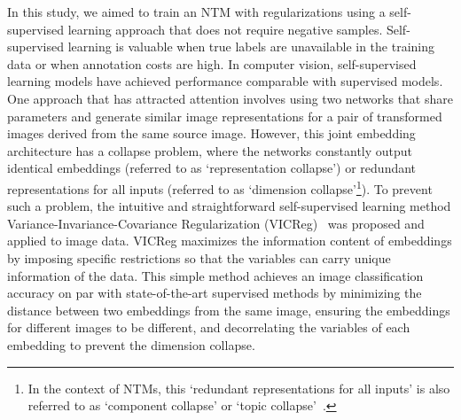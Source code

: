 \documentclass{article}
\begin{document}
In this study, we aimed to train an NTM with regularizations using a self-supervised learning approach that does not require negative samples. 
Self-supervised learning is valuable when true labels are unavailable in the training data or when annotation costs are high. 
In computer vision, self-supervised learning models have achieved performance comparable with supervised models. 
One approach that has attracted attention involves using two networks that share parameters and generate similar image representations for a pair of transformed images derived from the same source image.
However, this joint embedding architecture has a collapse problem, where the networks constantly output identical embeddings (referred to as `representation collapse') or redundant representations for all inputs (referred to as `dimension collapse'\footnote{In the context of NTMs, this `redundant representations for all inputs’ is also referred to as `component collapse’ or `topic collapse’~\cite{srivastava2017autoencoding,wu2023effective}.}).
To prevent such a problem, the intuitive and straightforward self-supervised learning method Variance-Invariance-Covariance Regularization (VICReg)~\cite{bardes2022vicreg} was proposed and applied to image data. 
VICReg maximizes the information content of embeddings by imposing specific restrictions so that the variables can carry unique information of the data.
This simple method achieves an image classification accuracy on par with state-of-the-art supervised methods by minimizing the distance between two embeddings from the same image, ensuring the embeddings for different images to be different, and decorrelating the variables of each embedding to prevent the dimension collapse.
\end{document}
